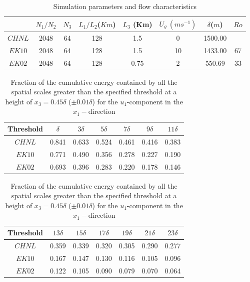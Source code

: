 

\clearpage

\begin{table}
	\caption{Simulation parameters and flow characteristics}
	\centering
	\begin{tabular}{ c c c c c c c c}
		\hline 
		       & $N_1/N_2$ & $N_3$ & $L_1/L_2$($Km$)  & $L_3$ (Km) & $U_g\ (ms^{-1})$ &$\delta$($m$)   & $Ro$ \\
		\hline  
		$CHNL$ & 2048      &  64   & 128              &  1.5       & 0                & 1500.00        &     \\
		$EK10$ & 2048      &  64   & 128              &  1.5       & 10               & 1433.00        & 67   \\
		$EK02$ & 2048      &  64   & 128              &  0.75      & 2                & 550.69         & 33  \\
		\hline 
		\hline 
	\end{tabular}
	\label{tab:sim_param_chap1}
\end{table}

\begin{table}
	\caption{Fraction of the cumulative energy contained by all the spatial scales greater than the specified threshold at a height of $x_3=0.45\delta$ ($\pm 0.01\delta$) for the $u_1$-component in the $x_1-$direction}
	\centering
	\begin{tabular}{c c c c c c c}
		\hline
		Threshold & $\delta$ & $3\delta$ & $5\delta$ & $7\delta$ & $9\delta$ & $11\delta$ \\
		\hline 
		$CHNL$ 	   & 0.841    & 0.633     & 0.524     & 0.461     & 0.416     & 0.383 \\ 
		$EK10$     & 0.771    & 0.490     & 0.356     & 0.278     & 0.227     & 0.190 \\ 
		$EK02$     & 0.693    & 0.396     & 0.283     & 0.220     & 0.178     & 0.146 \\
	\end{tabular}
	
	\begin{tabular}{c c c c c c c}
		\hline
		Threshold & $13\delta$ & $15\delta$ & $17\delta$ & $19\delta$ & $21\delta$ & $23\delta$  \\
		\hline 
		$CHNL$    & 0.359      & 0.339      & 0.320      & 0.305      & 0.290      & 0.277 \\
		$EK10$    & 0.167      & 0.147      & 0.130      & 0.116      & 0.105      & 0.096  \\
		$EK02$    & 0.122      & 0.105      & 0.090      & 0.079      & 0.070      & 0.064  \\
		\hline 
		\hline 
	\end{tabular}
	\label{tab:prcnt_cum_energy}
\end{table}

